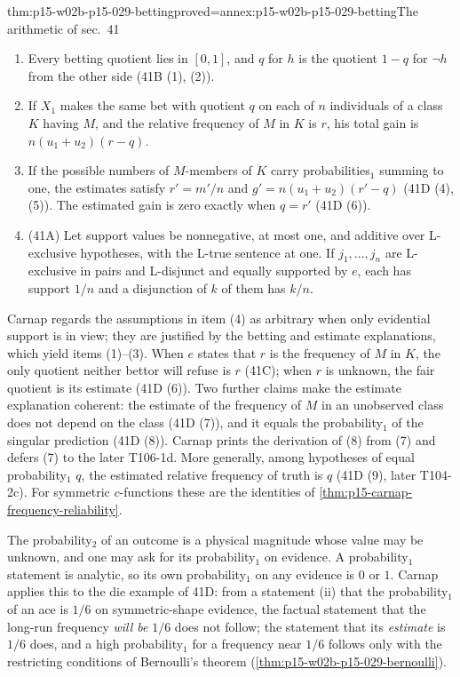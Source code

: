 \begin{hbtheorem}{thm:p15-w02b-p15-029-betting}{proved=annex:p15-w02b-p15-029-betting}{The arithmetic of sec.~41}
\begin{enumerate}
 \item Every betting quotient lies in \([0,1]\), and \(q\) for
       \(h\) is the quotient \(1-q\) for \(\neg h\) from the other
       side (41B (1), (2)).
 \item If \(X_1\) makes the same bet with quotient \(q\) on each of
       \(n\) individuals of a class \(K\) having \(M\), and the
       relative frequency of \(M\) in \(K\) is \(r\), his total gain
       is \(n(u_1+u_2)(r-q)\).
 \item If the possible numbers of \(M\)-members of \(K\) carry
       probabilities\(_1\) summing to one, the estimates satisfy
       \(r'=m'/n\) and \(g'=n(u_1+u_2)(r'-q)\) (41D (4), (5)). The
       estimated gain is zero exactly when \(q=r'\) (41D (6)).
 \item (41A) Let support values be nonnegative, at most one, and
       additive over L-exclusive hypotheses, with the L-true sentence
       at one. If \(j_1,\ldots,j_n\) are L-exclusive in pairs and
       L-disjunct and equally supported by \(e\), each has support
       \(1/n\) and a disjunction of \(k\) of them has \(k/n\).
\end{enumerate}
\end{hbtheorem}

Carnap regards the assumptions in item (4) as arbitrary when only
evidential support is in view; they are justified by the betting and
estimate explanations, which yield items (1)--(3). When \(e\) states
that \(r\) is the frequency of \(M\) in \(K\), the only quotient
neither bettor will refuse is \(r\) (41C); when \(r\) is unknown, the
fair quotient is its estimate (41D (6)). Two further claims make the
estimate explanation coherent: the estimate of the frequency of \(M\)
in an unobserved class does not depend on the class (41D (7)), and it
equals the probability\(_1\) of the singular prediction (41D (8)).
Carnap prints the derivation of (8) from (7) and defers (7) to the
later T106-1d. More generally, among hypotheses of equal
probability\(_1\) \(q\), the estimated relative frequency of truth
is \(q\) (41D (9), later T104-2c). For symmetric \(c\)-functions these
are the identities of \cref{thm:p15-carnap-frequency-reliability}.

The probability\(_2\) of an outcome is a physical magnitude whose value
may be unknown, and one may ask for its probability\(_1\) on evidence.
A probability\(_1\) statement is analytic, so its own probability\(_1\)
on any evidence is \(0\) or \(1\). Carnap applies this to the die
example of 41D: from a statement (ii) that the probability\(_1\) of an
ace is \(1/6\) on symmetric-shape evidence, the factual statement that
the long-run frequency \emph{will be} \(1/6\) does not follow; the
statement that its \emph{estimate} is \(1/6\) does, and a high
probability\(_1\) for a frequency near \(1/6\) follows only with the
restricting conditions of Bernoulli's theorem
(\cref{thm:p15-w02b-p15-029-bernoulli}).

